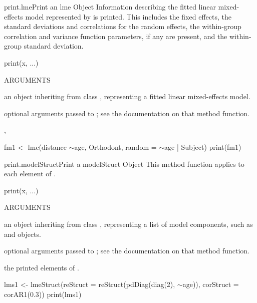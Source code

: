 \documentclass[pdftex]{article} \usepackage{url,graphicx}
\renewcommand{\Twiddle}{\mbox{\(\sim\)}}
\begin{document}
\begin{Helpfile}{print.lme}{Print an lme Object}
Information describing the fitted linear mixed-effects model
represented by  is printed. This includes the fixed
effects, the standard deviations and correlations for the
random effects, the within-group correlation and variance
function parameters, if any are present, and the within-group standard
deviation.
\begin{Example}
print(x, ...)
\end{Example}
\begin{Argument}{ARGUMENTS}
\item[\Co{x:}]
an object inheriting from class , representing
a fitted linear mixed-effects model.
\item[\Co{...:}]
optional arguments passed to ; see
the documentation on that method function.
\end{Argument}
, 
\need 15pt
\vspace{-16pt} 
\begin{Example}
fm1 <- lme(distance \Twiddle age, Orthodont, random = \Twiddle age | Subject)
print(fm1)
\end{Example}
\end{Helpfile}
\begin{Helpfile}{print.modelStruct}{Print a modelStruct Object}
This method function applies  to each element of
.
\begin{Example}
print(x, ...)
\end{Example}
\begin{Argument}{ARGUMENTS}
\item[\Co{x:}]
an object inheriting from class ,
representing a list of model components, such as  and
 objects.
\item[\Co{...:}]
optional arguments passed to ; see
the documentation on that method function.
\end{Argument}
the printed elements of .
\need 15pt
\vspace{-16pt} 
\begin{Example}
lms1 <- lmeStruct(reStruct = reStruct(pdDiag(diag(2), \Twiddle age)),
   corStruct = corAR1(0.3))
print(lms1)
\end{Example}
\end{Helpfile}
\end{document}
